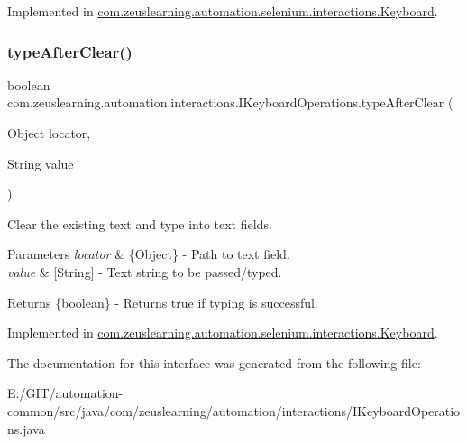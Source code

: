 Implemented in \hyperlink{classcom_1_1zeuslearning_1_1automation_1_1selenium_1_1interactions_1_1Keyboard_ac169af3cdaa7e24a4ec048c70540aaa1}{com.\+zeuslearning.\+automation.\+selenium.\+interactions.\+Keyboard}.

\hypertarget{interfacecom_1_1zeuslearning_1_1automation_1_1interactions_1_1IKeyboardOperations_a81c4fed89a3f9c822db19bad8a948f6b}{}\label{interfacecom_1_1zeuslearning_1_1automation_1_1interactions_1_1IKeyboardOperations_a81c4fed89a3f9c822db19bad8a948f6b} 
\subsubsection{\texorpdfstring{type\+After\+Clear()}{typeAfterClear()}}
{\footnotesize\ttfamily boolean com.\+zeuslearning.\+automation.\+interactions.\+I\+Keyboard\+Operations.\+type\+After\+Clear (\begin{DoxyParamCaption}\item[{Object}]{locator,  }\item[{String}]{value }\end{DoxyParamCaption})}

Clear the existing text and type into text fields.


\begin{DoxyParams}{Parameters}
{\em locator} & \{Object\} -\/ Path to text field. \\
\hline
{\em value} & \mbox{[}String\mbox{]} -\/ Text string to be passed/typed.\\
\hline
\end{DoxyParams}
\begin{DoxyReturn}{Returns}
\{boolean\} -\/ Returns {\ttfamily true} if typing is successful. 
\end{DoxyReturn}


Implemented in \hyperlink{classcom_1_1zeuslearning_1_1automation_1_1selenium_1_1interactions_1_1Keyboard_a2436faf2f5954d8e1d4cb326c7bb8e06}{com.\+zeuslearning.\+automation.\+selenium.\+interactions.\+Keyboard}.



The documentation for this interface was generated from the following file\+:\begin{DoxyCompactItemize}
\item 
E\+:/\+G\+I\+T/automation-\/common/src/java/com/zeuslearning/automation/interactions/I\+Keyboard\+Operations.\+java\end{DoxyCompactItemize}
